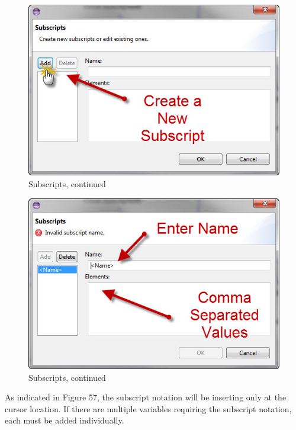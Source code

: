 \documentclass[11pt]{amsart}
\begin{document}
\begin{figure}[ht]
\begin{center}
\vspace{.2in}
\centerline {
\includegraphics[totalheight=0.3\textheight]{images/053.jpg}
}
\caption{Subscripts, continued}
\label{fig:053}
\end{center}
\end{figure}


\begin{figure}[ht]
\begin{center}
\vspace{.2in}
\centerline {
\includegraphics[totalheight=0.3\textheight]{images/054.jpg}
}
\caption{Subscripts, continued}
\label{fig:054}
\end{center}
\end{figure}

As indicated in Figure 57, the subscript notation will be inserting only at the cursor location. If there are multiple variables requiring the subscript notation, each must be added individually.
\end{document}
